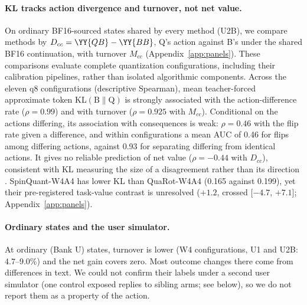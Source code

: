 \paragraph{KL tracks action divergence and turnover, not net value.} On ordinary BF16-sourced states shared by every method (U2B), we compare methods by $D_{cc}=\YY{QB}-\YY{BB}$, Q's action against B's under the shared BF16 continuation, with turnover $M_{cc}$ (Appendix~\ref{app:panels}). These comparisons evaluate complete quantization configurations, including their calibration pipelines, rather than isolated algorithmic components. Across the eleven q8 configurations (descriptive Spearman), mean teacher-forced approximate token KL$(\mathrm{B}\|\mathrm{Q})$ is strongly associated with the action-difference rate ($\rho=0.99$) and with turnover ($\rho=0.925$ with $M_{cc}$). Conditional on the actions differing, its association with consequences is weak: $\rho=0.46$ with the flip rate given a difference, and within configurations a mean AUC of 0.46 for flips among differing actions, against 0.93 for separating differing from identical actions. It gives no reliable prediction of net value ($\rho=-0.44$ with $D_{cc}$), consistent with KL measuring the size of a disagreement rather than its direction \citep{nikolic2026displacement}. SpinQuant-W4A4 has lower KL than QuaRot-W4A4 (0.165 against 0.199), yet their pre-registered task-value contrast is unresolved ($+1.2$\pp{}, crossed [$-4.7$, $+7.1$]; Appendix~\ref{app:panels}). %

\paragraph{Ordinary states and the user simulator.} At ordinary (Bank U) states, turnover is lower (W4 configurations, U1 and U2B: 4.7--9.0\%) and the net gain covers zero. Most outcome changes there come from differences in text. We could not confirm their labels under a second user simulator (one control exposed replies to sibling arms; see below), so we do not report them as a property of the action. %


